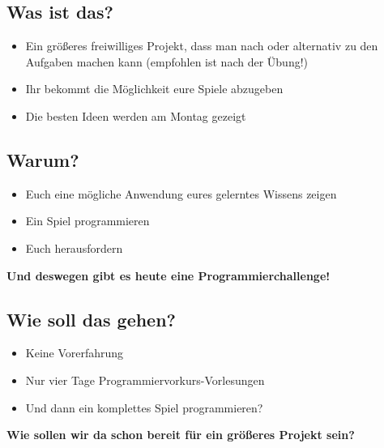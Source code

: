 \subsection{Was ist das?}
\begin{frame}
    \slidehead
    \pause
    \begin{itemize}
        \item Ein größeres freiwilliges Projekt, dass man nach oder alternativ zu den Aufgaben machen kann (empfohlen ist nach der Übung!)
        \item Ihr bekommt die Möglichkeit eure Spiele abzugeben
        \item Die besten Ideen werden am Montag gezeigt
    \end{itemize}
\end{frame}

\subsection{Warum?}
\begin{frame}
    \slidehead
    \pause
    \begin{itemize}
        \item Euch eine mögliche Anwendung eures gelerntes Wissens zeigen
        \item Ein Spiel programmieren
        \item Euch herausfordern
    \end{itemize}
    \pause
    \vspace{\fill}
    \begin{center}
        \textbf{\huge Und deswegen gibt es heute eine Programmierchallenge!}
    \end{center}
    \vspace{\fill}
\end{frame}

\subsection{Wie soll das gehen?}
\begin{frame}
    \slidehead
    \begin{itemize}
        \item Keine Vorerfahrung
        \item Nur vier Tage Programmiervorkurs-Vorlesungen
        \item Und dann ein komplettes Spiel programmieren?
    \end{itemize}
    \pause
    \vspace{\fill}
    \begin{center}
        \textbf{\huge Wie sollen wir da schon bereit für ein größeres Projekt sein?}
    \end{center}
    \vspace{\fill}
\end{frame}

